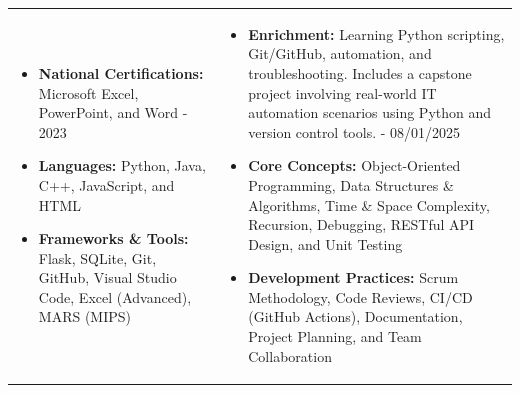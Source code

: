 \documentclass[10.5pt, letterpaper]{article}
\begin{document}
\begin{tabularx}{\textwidth}{X X}
  \begin{itemize}[leftmargin=1.5em, itemsep=4pt, topsep=0pt]
    \item \textbf{National Certifications:} Microsoft Excel, PowerPoint, and Word - 2023
    \item \textbf{Languages:} Python, Java, C++, JavaScript, and HTML
    \item \textbf{Frameworks \& Tools:} Flask, SQLite, Git, GitHub, Visual Studio Code, Excel (Advanced), MARS (MIPS)
  \end{itemize}
  &
  \begin{itemize}[leftmargin=1.5em, itemsep=4pt, topsep=0pt]
    \item \textbf{Enrichment:} Learning Python scripting, Git/GitHub, automation, and troubleshooting. Includes a capstone project involving real-world IT automation scenarios using Python and version control tools. - 08/01/2025
    \item \textbf{Core Concepts:} Object-Oriented Programming, Data Structures \& Algorithms, Time \& Space Complexity, Recursion, Debugging, RESTful API Design, and Unit Testing
    \item \textbf{Development Practices:} Scrum Methodology, Code Reviews, CI/CD (GitHub Actions), Documentation, Project Planning, and Team Collaboration
  \end{itemize}
\end{tabularx}
\end{document}
